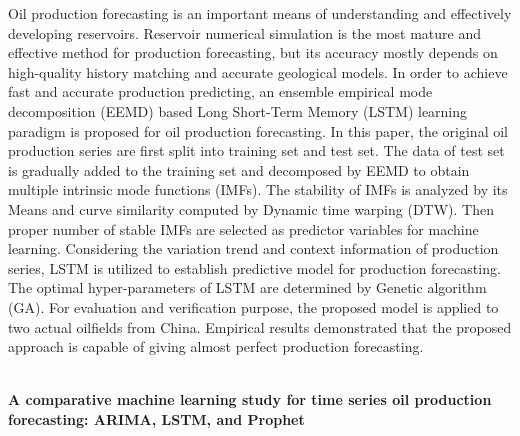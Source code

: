 Oil production forecasting is an important means of understanding and effectively developing reservoirs. Reservoir numerical simulation is the most mature and effective method for production forecasting, but its accuracy mostly depends on high-quality history matching and accurate geological models. In order to achieve fast and accurate production predicting, an ensemble empirical mode decomposition (EEMD) based Long Short-Term Memory (LSTM) learning paradigm is proposed for oil production forecasting. In this paper, the original oil production series are first split into training set and test set. The data of test set is gradually added to the training set and decomposed by EEMD to obtain multiple intrinsic mode functions (IMFs). The stability of IMFs is analyzed by its Means and curve similarity computed by Dynamic time warping (DTW). Then proper number of stable IMFs are selected as predictor variables for machine learning. Considering the variation trend and context information of production series, LSTM is utilized to establish predictive model for production forecasting. The optimal hyper-parameters of LSTM are determined by Genetic algorithm (GA). For evaluation and verification purpose, the proposed model is applied to two actual oilfields from China. Empirical results demonstrated that the proposed approach is capable of giving almost perfect production forecasting.



\\

\textbf{A comparative machine learning study for time series oil production forecasting: ARIMA, LSTM, and Prophet}

